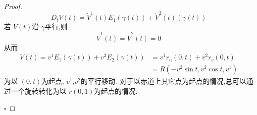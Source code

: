 \documentclass[../../main.tex]{subfiles}
\begin{document}
\begin{proof}
\[    D_{t}V\left( t \right)= \dot{V}^{1}\left( t \right)E_1\left(  \gamma \left( t \right)  \right)+ \dot{V}^{2}\left( t \right)\left(  \gamma \left( t \right)  \right)     
    \]若 \(  V\left( t \right)   \)沿 \(   \gamma   \)平行,则 \[
    \dot{V}^{1}\left( t \right)=   \dot{V}^{2}\left( t \right)= 0 
    \]  从而 \[
    \begin{aligned}
    V\left( t \right)= v^{1}E_1\left(  \gamma \left( t \right)  \right)+ v^{2}E_2\left(  \gamma \left( t \right)  \right)&= v^{1}r_{u}\left( 0,t \right)+ v^{2}r_{v}\left( 0,t \right) \\ 
     &=R \left( -v^{2}\sin t,v^{2}\cos t , v^{1} \right)      
    \end{aligned}
    \]为以 \(  \left( 0,t \right)   \)为起点, \(  v^{1}  \),\(  v^{2}  \)的平行移动.  对于以赤道上其它点为起点的情况,总可以通过一个旋转转化为以 \(  r\left( 0,1 \right)   \)为起点的情况.   

    \hfill $\square$
\end{proof}
\end{document}
